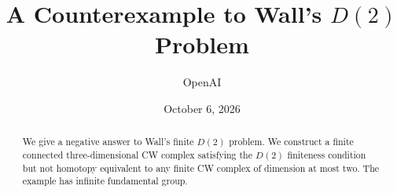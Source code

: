 \documentclass[11pt]{article}
\title{A Counterexample to Wall's \texorpdfstring{$D(2)$}{D(2)} Problem}
\author{OpenAI}
\date{October 6, 2026}
\begin{document}
\maketitle
\begin{abstract}
We give a negative answer to Wall's finite $D(2)$ problem. We construct
a finite connected three-dimensional CW complex satisfying the $D(2)$
finiteness condition but not homotopy equivalent to any finite CW complex
of dimension at most two. The example has infinite fundamental group.
\end{abstract}






\end{document}
